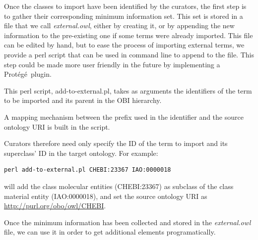 \documentclass[a4paper,10pt,twocolumn]{article}
\newcommand{\protege}{Prot\'{e}g\'{e}}
\begin{document}
Once the classes to import have been identified by the curators, the first step is to gather their corresponding minimum information set.
This set is stored in a file that we call \emph{external.owl}, either by creating it, or by appending the new information to the pre-existing one if some terms were already imported.
This file can be edited by hand, but to ease the process of importing external terms, we provide a perl script that can be used in command line to append to the file. This step could be made more user friendly in the future by implementing a \protege\ plugin.

This perl script, add-to-external.pl, takes as arguments the identifiers of the term to be imported and its parent in the OBI hierarchy.


A mapping mechanism between the prefix used in the identifier and the source ontology URI is built in the script.


Curators therefore need only specify the ID of the term to import and its superclass' ID in the target ontology.
For example:


\begin{footnotesize}
\begin{verbatim}
perl add-to-external.pl CHEBI:23367 IAO:0000018
\end{verbatim}%
\end{footnotesize}
will add the class molecular entities (CHEBI:23367) as subclass of the class material entity (IAO:0000018), and set the source ontology URI as \url{http://purl.org/obo/owl/CHEBI}.

Once the minimum information has been collected  and stored in the \emph{external.owl} file, we can use it in order to get additional elements programatically.
\end{document}
